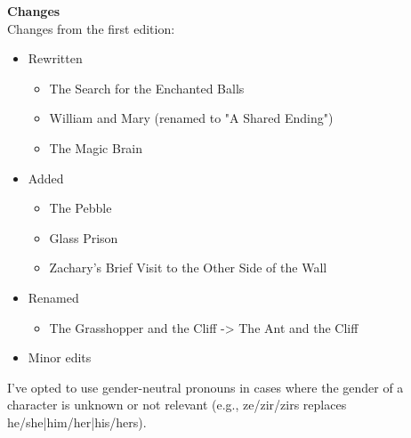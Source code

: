 \huge \textbf{Changes}\\

\large
Changes from the first edition:\\
\begin{itemize}
	\item Rewritten
	\begin{itemize}
		\item The Search for the Enchanted Balls
		\item William and Mary (renamed to "A Shared Ending")
		\item The Magic Brain
	\end{itemize}
	\item Added
	\begin{itemize}
		\item The Pebble
		\item Glass Prison
		\item Zachary's Brief Visit to the Other Side of the Wall
	\end{itemize}
	\item Renamed
	\begin{itemize}
		\item The Grasshopper and the Cliff -> The Ant and the Cliff
	\end{itemize}
	\item Minor edits
\end{itemize}

\vspace{10pt}
I've opted to use gender-neutral pronouns in cases where the gender of a character is unknown or not relevant (e.g., ze/zir/zirs replaces he/she|him/her|his/hers).